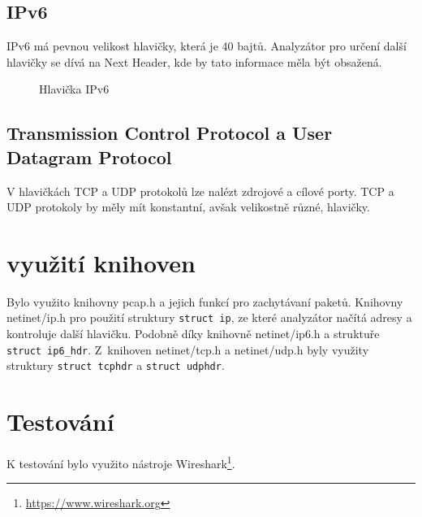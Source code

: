 \documentclass[a4paper, 12pt, titlepage]{article}
\begin{document}
\subsection{IPv6}
IPv6 má pevnou velikost hlavičky, která je 40 bajtů. Analyzátor pro určení další hlavičky se dívá na Next Header, kde by tato informace měla být obsažená.
\begin{figure}[H]
    \centering
    \caption{Hlavička IPv6\cite{obr2}}
    \label{obrazek 2}
\end{figure}
\subsection{Transmission Control Protocol a User Datagram Protocol}
V hlavičkách TCP a UDP protokolů lze nalézt zdrojové a cílové porty. TCP a UDP protokoly by měly mít konstantní, avšak velikostně různé, hlavičky.

\section{využití knihoven}

Bylo využito knihovny pcap.h a jejich funkcí pro zachytávaní paketů. Knihovny netinet/ip.h\cite{ip} pro použití struktury \verb|struct ip|, ze které analyzátor načítá adresy a kontroluje další hlavičku. Podobně díky knihovně netinet/ip6.h\cite{ip6} a struktuře \verb|struct ip6_hdr|. Z~knihoven netinet/tcp.h\cite{tcp} a netinet/udp.h\cite{udp} byly využity struktury \verb|struct tcphdr| a \verb|struct udphdr|. 

\section{Testování}
K testování bylo využito nástroje Wireshark\footnote{\url{https://www.wireshark.org}}.
\end{document}

